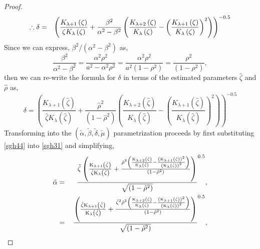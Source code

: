 \begin{proof}
\begin{eqnarray}
  \therefore \delta  & = & {\left(\frac{{{K_{\lambda  + 1}}\left(\zeta \right)}}{{\zeta {K_\lambda }\left(\zeta \right)}} + \frac{{{\beta ^2}}}{{{\alpha ^2} - {\beta ^2}}}\left(\frac{{{K_{\lambda  + 2}}\left(\zeta \right)}}{{{K_\lambda }\left(\zeta \right)}} - {\left(\frac{{{K_{\lambda  + 1}}\left(\zeta \right)}}{{{K_\lambda }\left(\zeta \right)}}\right)^2}\right)\right)^{ - 0.5}} \hfill\label{sgh42}
\end{eqnarray}
Since we can express, $\beta^2/\left(\alpha^2 - \beta^2\right)$ as,
\begin{equation}\label{sgh43}
\frac{{{\beta ^2}}}{{{\alpha ^2} - {\beta ^2}}} = \frac{{{\alpha ^2}{\rho ^2}}}{{{a^2} - {\alpha ^2}{\rho ^2}}} = \frac{{{\alpha ^2}{\rho ^2}}}{{{a^2}\left(1 - {\rho ^2}\right)}} = \frac{{{\rho ^2}}}{{\left(1 - {\rho ^2}\right)}},
\end{equation}
then we can re-write the formula for $\delta$ in terms of the estimated parameters $\hat\zeta$ and $\hat\rho$ as,
\begin{equation}\label{sgh44}
\delta  = {\left(\frac{{{K_{\lambda  + 1}}\left(\hat \zeta \right)}}{{\hat \zeta {K_\lambda }\left(\hat \zeta \right)}} + \frac{{{{\hat \rho }^2}}}{{\left(1 - {{\hat \rho }^2}\right)}}\left(\frac{{{K_{\lambda  + 2}}\left(\hat \zeta \right)}}{{{K_\lambda }\left(\hat \zeta \right)}} - {\left(\frac{{{K_{\lambda  + 1}}\left(\hat \zeta \right)}}{{{K_\lambda }\left(\hat \zeta \right)}}\right)^2}\right)\right)^{ - 0.5}}
\end{equation}
Transforming into the $(\tilde \alpha ,\tilde \beta ,\tilde \delta ,\tilde \mu )$
parametrization proceeds by first substituting \ref{sgh44} into \ref{sgh31} and
simplifying,
\begin{eqnarray}
  \tilde \alpha & = & \,{\frac{{\hat \zeta \left( {\frac{{{{\text{K}}_{\lambda  + 1}}\left( {\hat \zeta } \right)}}{{\hat \zeta {{\text{K}}_\lambda }\left( {\hat \zeta } \right)}} + \frac{{{{\hat \rho }^2}\left( {\frac{{{{\text{K}}_{\lambda  + 2}}\left( {\hat \zeta } \right)}}{{{{\text{K}}_\lambda }\left( {\hat \zeta } \right)}} - \frac{{{{\left( {{{\text{K}}_{\lambda  + 1}}\left( {\hat \zeta } \right)} \right)}^2}}}{{{{\left( {{{\text{K}}_\lambda }\left( {\hat \zeta } \right)} \right)}^2}}}} \right)}}{{\left( {1 - {{\hat \rho }^2}} \right)}}} \right)}}{{\sqrt {(1 - {{\hat \rho }^2})} }}^{0.5}}, \hfill\nonumber \\
   & = &\,{\frac{{\left( {\frac{{\hat \zeta {{\text{K}}_{\lambda  + 1}}\left( {\hat \zeta } \right)}}{{{{\text{K}}_\lambda }\left( {\hat \zeta } \right)}} + \frac{{{{\hat \zeta }^2}{{\hat \rho }^2}\left( {\frac{{{{\text{K}}_{\lambda  + 2}}\left( {\hat \zeta } \right)}}{{{{\text{K}}_\lambda }\left( {\hat \zeta } \right)}} - \frac{{{{\left( {{{\text{K}}_{\lambda  + 1}}\left( {\hat \zeta } \right)} \right)}^2}}}{{{{\left( {{{\text{K}}_\lambda }\left( {\hat \zeta } \right)} \right)}^2}}}} \right)}}{{\left( {1 - {{\hat \rho }^2}} \right)}}} \right)}}{{\sqrt {(1 - {\hat \rho ^2})} }}^{0.5}}, \hfill\nonumber \\

\end{eqnarray}
\end{proof}

